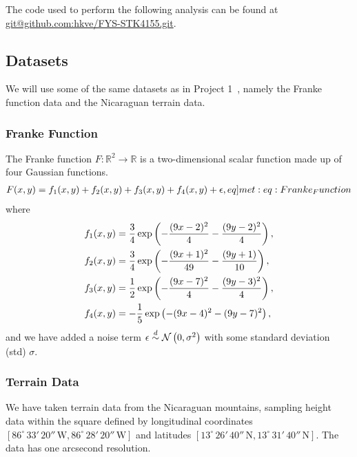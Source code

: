 The code used to perform the following analysis can be found at \url{git@github.com:hkve/FYS-STK4155.git}.

\subsection{Datasets}
    We will use some of the same datasets as in Project 1~\citep{Project1}, namely the Franke function data and the Nicaraguan terrain data.
    \subsubsection{Franke Function}
        The Franke function $F: \mathbb{R}^2 \to \mathbb{R}$ is a two-dimensional scalar function made up of four Gaussian functions.
        \begin{align}
            F(x,y) = f_1(x,y) + f_2(x,y) + f_3(x,y) + f_4(x,y) + \epsilon, \label[eq]{met:eq:Franke_Function}
        \end{align}
        where
        \begin{subequations}
            \begin{align}
                f_1(x,y) &= \frac{3}{4}\operatorname{exp}\left( -\frac{(9x-2)^2}{4} - \frac{(9y-2)^2}{4} \right), \\
                f_2(x,y) &= \frac{3}{4}\operatorname{exp}\left( -\frac{(9x+1)^2}{49} - \frac{(9y+1)}{10} \right), \\
                f_3(x,y) &= \frac{1}{2}\operatorname{exp}\left( -\frac{(9x-7)^2}{4} - \frac{(9y-3)^2}{4} \right), \\
                f_4(x,y) &= -\frac{1}{5}\operatorname{exp}\left( -(9x-4)^2 - (9y-7)^2 \right),
            \end{align}
        \end{subequations}
        and we have added a noise term $\epsilon \overset{d}{\sim} \operatorname{\mathcal{N}}\left(0,\sigma^2\right)$ with some standard deviation (std) $\sigma$.

    \subsubsection{Terrain Data}
        We have taken terrain data from the Nicaraguan mountains, sampling height data within the square defined by longitudinal coordinates $[86^\circ\,33'\,20''\,\text{W}, 86^\circ\,28'\,20''\,\text{W}]$ and latitudes $[13^\circ\,26'\,40''\,\text{N}, 13^\circ\,31'\,40''\,\text{N}]$. The data has one arcsecond resolution.

